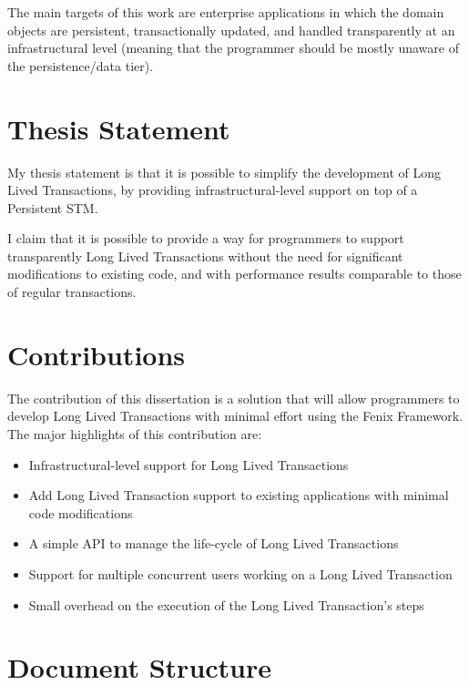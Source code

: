 The main targets of this work are enterprise applications in which the
domain objects are persistent, transactionally updated, and handled
transparently at an infrastructural level (meaning that the programmer
should be mostly unaware of the persistence/data tier).

\section{Thesis Statement}

My thesis statement is that it is possible to simplify the development
of Long Lived Transactions, by providing infrastructural-level support
on top of a Persistent STM.

I claim that it is possible to provide a way for programmers to
support transparently Long Lived Transactions without the need for
significant modifications to existing code, and with performance
results comparable to those of regular transactions.

\section{Contributions}

The contribution of this dissertation is a solution that will allow
programmers to develop Long Lived Transactions with minimal effort
using the Fenix Framework. The major highlights of this contribution
are:

\begin{itemize}

\item Infrastructural-level support for Long Lived
  Transactions

\item Add Long Lived Transaction support to existing applications with
  minimal code modifications

\item A simple API to manage the life-cycle of Long Lived Transactions

\item Support for multiple concurrent users working on a Long Lived
  Transaction

\item Small overhead on the execution of the Long Lived Transaction's
  steps

\end{itemize}

\section{Document Structure}

